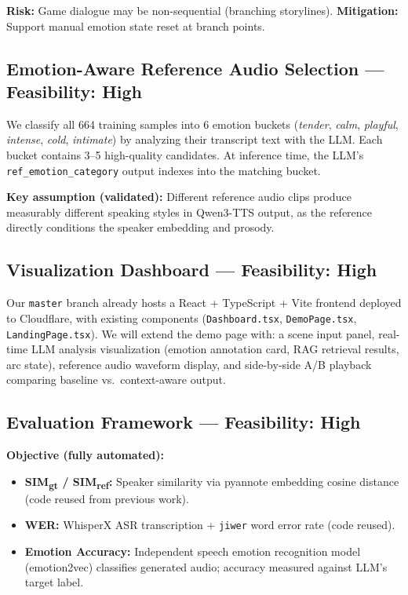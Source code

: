 \documentclass[11pt,a4paper]{article}
\begin{document}
\textbf{Risk:} Game dialogue may be non-sequential (branching storylines). \textbf{Mitigation:} Support manual emotion state reset at branch points.

\subsection{Emotion-Aware Reference Audio Selection --- Feasibility: High}

We classify all 664 training samples into 6 emotion buckets (\emph{tender}, \emph{calm}, \emph{playful}, \emph{intense}, \emph{cold}, \emph{intimate}) by analyzing their transcript text with the LLM. Each bucket contains 3--5 high-quality candidates. At inference time, the LLM's \texttt{ref\_emotion\_category} output indexes into the matching bucket.

\textbf{Key assumption (validated):} Different reference audio clips produce measurably different speaking styles in Qwen3-TTS output, as the reference directly conditions the speaker embedding and prosody.

\subsection{Visualization Dashboard --- Feasibility: High}

Our \texttt{master} branch already hosts a React + TypeScript + Vite frontend deployed to Cloudflare, with existing components (\texttt{Dashboard.tsx}, \texttt{DemoPage.tsx}, \texttt{LandingPage.tsx}). We will extend the demo page with: a scene input panel, real-time LLM analysis visualization (emotion annotation card, RAG retrieval results, arc state), reference audio waveform display, and side-by-side A/B playback comparing baseline vs.\ context-aware output.

\subsection{Evaluation Framework --- Feasibility: High}

\textbf{Objective (fully automated):}
\begin{itemize}
    \item \textbf{SIM\textsubscript{gt} / SIM\textsubscript{ref}:} Speaker similarity via pyannote embedding cosine distance (code reused from previous work).
    \item \textbf{WER:} WhisperX ASR transcription + \texttt{jiwer} word error rate (code reused).
    \item \textbf{Emotion Accuracy:} Independent speech emotion recognition model (emotion2vec) classifies generated audio; accuracy measured against LLM's target label.
\end{itemize}
\end{document}
